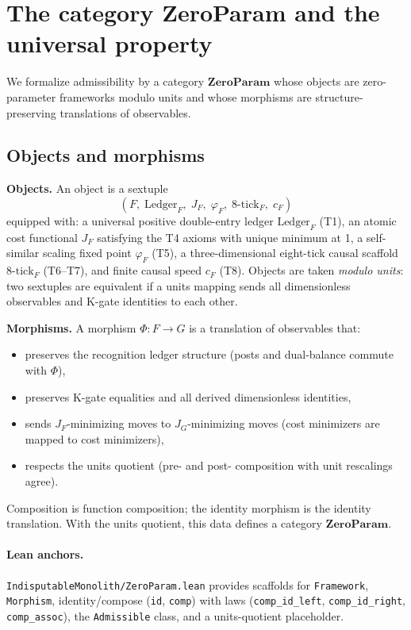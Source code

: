 \documentclass[11pt]{article}
\begin{document}
\section{The category ZeroParam and the universal property}
We formalize admissibility by a category \(\mathbf{ZeroParam}\) whose objects are zero\mbox{-}parameter frameworks modulo units and whose morphisms are structure\mbox{-}preserving translations of observables.

\subsection{Objects and morphisms}
\textbf{Objects.} An object is a sextuple
\[
  (F,\; \mathrm{Ledger}_F,\; J_F,\; \varphi_F,\; 8\mbox{-}\mathrm{tick}_F,\; c_F)
\]
equipped with: a universal positive double\mbox{-}entry ledger \(\mathrm{Ledger}_F\) (T1), an atomic cost functional \(J_F\) satisfying the T4 axioms with unique minimum at 1, a self\mbox{-}similar scaling fixed point \(\varphi_F\) (T5), a three\mbox{-}dimensional eight\mbox{-}tick causal scaffold \(8\mbox{-}\mathrm{tick}_F\) (T6--T7), and finite causal speed \(c_F\) (T8). Objects are taken \emph{modulo units}: two sextuples are equivalent if a units mapping sends all dimensionless observables and K\mbox{-}gate identities to each other.

\textbf{Morphisms.} A morphism \(\Phi\colon F\to G\) is a translation of observables that:
\begin{itemize}
  \item preserves the recognition ledger structure (posts and dual\mbox{-}balance commute with \(\Phi\)),
  \item preserves K\mbox{-}gate equalities and all derived dimensionless identities,
  \item sends \(J_F\)\mbox{-}minimizing moves to \(J_G\)\mbox{-}minimizing moves (cost minimizers are mapped to cost minimizers),
  \item respects the units quotient (pre\mbox{-} and post\mbox{-} composition with unit rescalings agree).
\end{itemize}
Composition is function composition; the identity morphism is the identity translation. With the units quotient, this data defines a category \(\mathbf{ZeroParam}\).

\paragraph{Lean anchors.} \texttt{IndisputableMonolith/ZeroParam.lean} provides scaffolds for \texttt{Framework}, \texttt{Morphism}, identity/compose (\texttt{id}, \texttt{comp}) with laws (\texttt{comp\_id\_left}, \texttt{comp\_id\_right}, \texttt{comp\_assoc}), the \texttt{Admissible} class, and a units\mbox{-}quotient placeholder.
\end{document}
